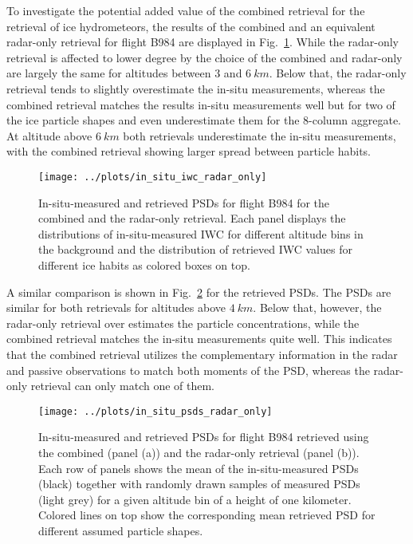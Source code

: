 \documentclass[journal abbreviation, manuscript]{copernicus}
\begin{document}
To investigate the potential added value of the combined retrieval for the
retrieval of ice hydrometeors, the results of the combined and an equivalent
radar-only retrieval for flight B984 are displayed in
Fig.~\ref{fig:in_situ_iwc_radar_only}. While the radar-only retrieval is affected to
lower degree by the choice of the combined and radar-only are largely the same
for altitudes between $3$ and $6\ \unit{km}$. Below that, the radar-only
retrieval tends to slightly overestimate the in-situ measurements, whereas the
combined retrieval matches the results in-situ measurements well but for two of
the ice particle shapes and even underestimate them for the 8-column aggregate.
At altitude above $6\ \unit{km}$ both retrievals underestimate the in-situ
measurements, with the combined retrieval showing larger spread between
particle habits.

\begin{figure}[!hbpt]
  \centering
  \texttt{[image: ../plots/in\_situ\_iwc\_radar\_only]}
  \caption{In-situ-measured and retrieved PSDs for flight B984
    for the combined and the radar-only retrieval. Each panel displays
    the distributions of in-situ-measured IWC for different altitude
    bins in the background and the distribution of retrieved IWC values
    for different ice habits as colored boxes on top.}
  \label{fig:in_situ_iwc_radar_only}
\end{figure}

A similar comparison is shown in Fig.~\ref{fig:in_situ_psds_radar_only} for the
retrieved PSDs. The PSDs are similar for both retrievals for altitudes above
$4\ \unit{km}$. Below that, however, the radar-only retrieval over estimates the
particle concentrations, while the combined retrieval matches the in-situ
measurements quite well. This indicates that the combined retrieval utilizes the
complementary information in the radar and passive observations to match both
moments of the PSD, whereas the radar-only retrieval can
only match one of them.


\begin{figure}[!hbpt]
  \centering
  \texttt{[image: ../plots/in\_situ\_psds\_radar\_only]}
  \caption{In-situ-measured and retrieved PSDs for flight B984
    retrieved using the combined (panel (a)) and the radar-only retrieval
    (panel (b)). Each row of panels shows the mean of the in-situ-measured
    PSDs (black) together with randomly drawn samples of measured PSDs
    (light grey) for a given altitude bin of a height of one kilometer.
    Colored lines on top show the corresponding mean retrieved PSD for
    different assumed particle shapes.}
  \label{fig:in_situ_psds_radar_only}
\end{figure}
\end{document}

